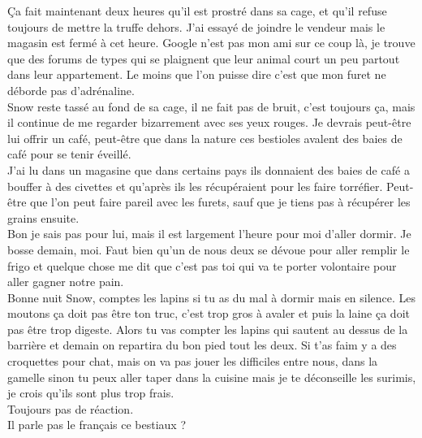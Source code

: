 Ça fait maintenant deux heures qu'il est prostré dans sa cage, et qu'il refuse toujours de mettre la truffe dehors. J'ai essayé de joindre le vendeur mais le magasin est fermé à cet heure. Google n'est pas mon ami sur ce coup là, je trouve que des forums de types qui se plaignent que leur animal court un peu partout dans leur appartement. Le moins que l'on puisse dire c'est que mon furet ne déborde pas d'adrénaline.\\
Snow reste tassé au fond de sa cage, il ne fait pas de bruit, c'est toujours ça, mais il continue de me regarder bizarrement avec ses yeux rouges. Je devrais peut-être lui offrir un café, peut-être que dans la nature ces bestioles avalent des baies de café pour se tenir éveillé.\\
J'ai lu dans un magasine que dans certains pays ils donnaient des baies de café a bouffer à des civettes et qu'après ils les récupéraient pour les faire torréfier. Peut-être que l'on peut faire pareil avec les furets, sauf que je tiens pas à récupérer les grains ensuite. \\

Bon je sais pas pour lui, mais il est largement l'heure pour moi d'aller dormir. Je bosse demain, moi. Faut bien qu'un de nous deux se dévoue pour aller remplir le frigo et quelque chose me dit que c'est pas toi qui va te porter volontaire pour aller gagner notre pain. \\
Bonne nuit Snow, comptes les lapins si tu as du mal à dormir mais en silence. Les moutons ça doit pas être ton truc, c'est trop gros à avaler et puis la laine ça doit pas être trop digeste. Alors tu vas compter les lapins qui sautent au dessus de la barrière et demain on repartira du bon pied tout les deux. Si t'as faim y a des croquettes pour chat, mais on va pas jouer les difficiles entre nous, dans la gamelle sinon tu peux aller taper dans la cuisine mais je te déconseille les surimis, je crois qu'ils sont plus trop frais. \\

Toujours pas de réaction. \\

Il parle pas le français ce bestiaux ? \\